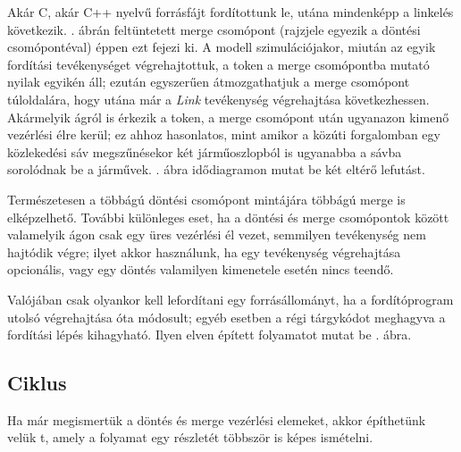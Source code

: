 \begin{pelda}
Akár C, akár C++ nyelvű forrásfájt fordítottunk le, utána mindenképp a linkelés következik. . ábrán feltüntetett merge csomópont (rajzjele egyezik a döntési csomópontéval) éppen ezt fejezi ki. A modell szimulációjakor, miután az egyik fordítási tevékenységet végrehajtottuk, a token a merge csomópontba mutató nyilak egyikén áll; ezután egyszerűen átmozgathatjuk a merge csomópont túloldalára, hogy utána már a \emph{Link} tevékenység végrehajtása következhessen. Akármelyik ágról is érkezik a token, a merge csomópont után ugyanazon kimenő vezérlési élre kerül; ez ahhoz hasonlatos, mint amikor a közúti forgalomban egy közlekedési sáv megszűnésekor két járműoszlopból is ugyanabba a sávba sorolódnak be a járművek. . ábra idődiagramon mutat be két eltérő lefutást.  
\end{pelda}




Természetesen a többágú döntési csomópont mintájára többágú merge is elképzelhető. További különleges eset, ha a döntési és merge csomópontok között valamelyik ágon csak egy üres vezérlési él vezet, semmilyen tevékenység nem hajtódik végre; ilyet akkor használunk, ha egy tevékenység végrehajtása opcionális, vagy egy döntés valamilyen kimenetele esetén nincs teendő.

\begin{pelda}
Valójában csak olyankor kell lefordítani egy forrásállományt, ha a fordítóprogram utolsó végrehajtása óta módosult; egyéb esetben a régi tárgykódot meghagyva a fordítási lépés kihagyható. Ilyen elven épített folyamatot mutat be . ábra.  
\end{pelda}



\subsection{Ciklus}
Ha már megismertük a döntés és merge vezérlési elemeket, akkor építhetünk velük t, amely a folyamat egy részletét többször is képes ismételni. 

